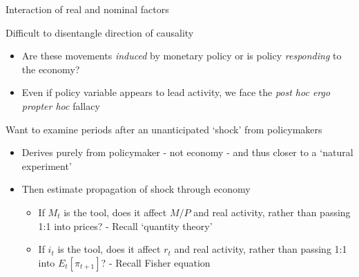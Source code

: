 \begin{frame}{Interaction of real and nominal factors}

Difficult to disentangle direction of causality
\begin{itemize}
\item	Are these movements \emph{induced} by monetary policy or is policy \emph{responding} to the economy?
\item	Even if policy variable appears to lead activity, we face the \emph{post hoc ergo propter hoc} fallacy
\end{itemize}

\vspace{2mm}
Want to examine periods after an unanticipated `shock' from policymakers
\begin{itemize}
\item	Derives purely from policymaker - not economy - and thus closer to a `natural experiment'
\item	Then estimate propagation of shock through economy
	\begin{itemize}
	\item	If $M_{t}$ is the tool, does it affect $M/P$ and real activity, rather than passing 1:1 into prices? - Recall `quantity theory'
	\item	If $i_{t}$ is the tool, does it affect $r_{t}$ and real activity, rather than passing 1:1 into $E_{t}[\pi_{t+1}]$? - Recall Fisher equation
	\end{itemize}
\end{itemize}

\end{frame}



